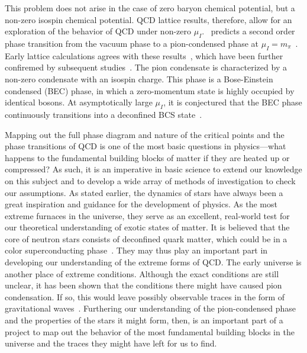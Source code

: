 This problem does not arise in the case of zero baryon chemical potential, but a non-zero isospin chemical potential.
QCD lattice results, therefore, allow for an exploration of the behavior of QCD under non-zero $\mu_I$.
\chpt\, predicts a second order phase transition from the vacuum phase to a pion-condensed phase at $\mu_I = m_\pi$~\autocite{sonQCDFiniteIsospin2001}.
Early lattice calculations agrees with these results~\autocite{kogutQuenchedLatticeQCD2002,kogutLatticeQCDFinite2002,kogutFiniteTemperatureTransition2004,sinclairSearchingElusiveCritical2006}, 
which have been further confiremed by subsequent studies~\autocite{brandtNewClassCompact2018,brandtQCDFiniteIsospin2018,brandtQCDPhaseDiagram2018,brandtReliabilityTaylorExpansions2019,brandtQCDPhaseDiagram2017}.
The pion condensate is characterized by a non-zero condensate with an isospin charge.
This phase is a Bose-Einstein condensed (BEC) phase, in which a zero-momentum state is highly occupied by identical bosons.
At asymptotically large $\mu_I$, it is conjectured that the BEC phase continuously transitions into a deconfined BCS state~\autocite{sonQCDFiniteIsospin2001a,sonQCDFiniteIsospin2001}.




Mapping out the full phase diagram and nature of the critical points and the phase transitions of QCD is one of the most basic questions in physics---what happens to the fundamental building blocks of matter if they are heated up or compressed?
As such, it is an imperative in basic science to extend our knowledge on this subject and to develop a wide array of methods of investigation to check our assumptions.
As stated earlier, the dynamics of stars have always been a great inspiration and guidance for the development of physics.
As the most extreme furnaces in the universe, they serve as an excellent, real-world test for our theoretical understanding of exotic states of matter.
It is believed that the core of neutron stars consists of deconfined quark matter, which could be in a color superconducting phase~\autocite{baymHadronsQuarksNeutron2018,alfordColorSuperconductivityDense2008}.
They may thus play an important part in developing our understanding of the extreme forms of QCD.
The early universe is another place of extreme conditions.
Although the exact conditions are still unclear, it has been shown that the conditions there might have caused pion condensation.
If so, this would leave possibly observable traces in the form of gravitational waves~\autocite{hajkarimEffectsQCDEquation2019,wygasCosmicQCDEpoch2018,vovchenkoPionCondensationEarly2021}.
Furthering our understanding of the pion-condensed phase and the properties of the stars it might form, then, is an important part of a project to map out the behavior of the most fundamental building blocks in the universe and the traces they might have left for us to find.




